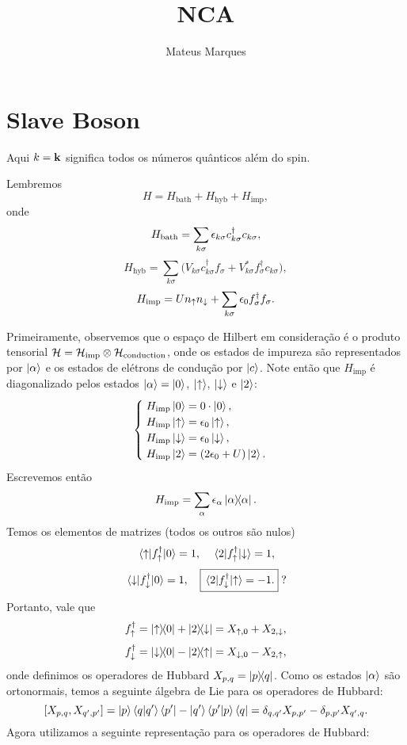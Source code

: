 \documentclass[a4paper,fleqn,12pt]{article}
\title{\Huge{\textbf{NCA}}}
\author{Mateus Marques}
\renewcommand{\a}{\alpha}
\renewcommand{\s}{\sigma}
\renewcommand{\d}{\dagger}
\begin{document}
\maketitle

\section{Slave Boson}

Aqui $k = \vb{k}$ significa todos os números quânticos além do spin.

Lembremos
$$
H = H_{\text{bath}} + H_{\text{hyb}} + H_{\text{imp}},
$$
onde
$$
H_{\text{bath}} = \sum_{k \s} \eps_{k \s} c_{k \s}^\d c_{k\s},
$$
$$
H_{\text{hyb}} = \sum_{k \s}
\Big(
V_{k\s} c_{k\s}^\d f_\s + V_{k\s}^* f_\s^\d c_{k\s}
\Big),
$$
$$
H_{\text{imp}} = U n_{\up} n_\dn + \sum_{k \s} \eps_{0} f_{\s}^\d f_{\s}.
$$

Primeiramente, observemos que o espaço de Hilbert em consideração é o produto tensorial $\mathcal{H} = \mathcal{H}_{\text{imp}} \otimes \mathcal{H}_{\text{conduction}}$, onde os estados de impureza são representados por $\ket{\alpha}$ e os estados de elétrons de condução por $\ket{c}$. Note então que $H_{\text{imp}}$ é diagonalizado pelos estados $\ket{\alpha} = \ket{0}$, $\ket{\uparrow}$, $\ket{\downarrow}$ e $\ket{2}$:
$$
\begin{cases}
\; H_{\text{imp}} \ket{0} = 0 \cdot \ket{0}, \\
\; H_{\text{imp}} \ket{\uparrow} = \epsilon_0 \ket{\uparrow}, \\
\; H_{\text{imp}} \ket{\downarrow} = \epsilon_0 \ket{\downarrow}, \\
\; H_{\text{imp}} \ket{2}   = (2\epsilon_0 + U) \ket{2}.
\end{cases}
$$
Escrevemos então
$$
H_{\text{imp}} = \sum_\a \eps_\a \ketbra{\a}{\a}.
$$
Temos os elementos de matrizes (todos os outros são nulos)
$$
\mel{\up}{f_\up^\d}{0} = 1, \quad \mel{2}{f_\up^\d}{\dn} = 1,
$$
$$
\mel{\dn}{f_\dn^\d}{0} = 1, \quad \boxed{\mel{2}{f_\dn^\d}{\up} = -1.} \; ?
$$
Portanto, vale que
$$
f_\up^\d = \ketbra{\up}{0} + \ketbra{2}{\dn} = X_{\up, 0} + X_{2, \dn},
$$
$$
f_\dn^\d = \ketbra{\dn}{0} - \ketbra{2}{\up} = X_{\dn, 0} - X_{2, \up},
$$
onde definimos os operadores de Hubbard $X_{p, q} = \ketbra{p}{q}$. Como os estados $\ket{\a}$ são ortonormais, temos a seguinte álgebra de Lie para os operadores de Hubbard:
$$
[X_{p, q}, X_{q', p'}] = \ket{p}\braket{q}{q'}\bra{p'} - \ket{q'}\braket{p'}{p}\bra{q}
= \delta_{q, q'} X_{p, p'} - \delta_{p, p'} X_{q', q}.
$$
Agora utilizamos a seguinte representação para os operadores de Hubbard:

\n
\end{document}
